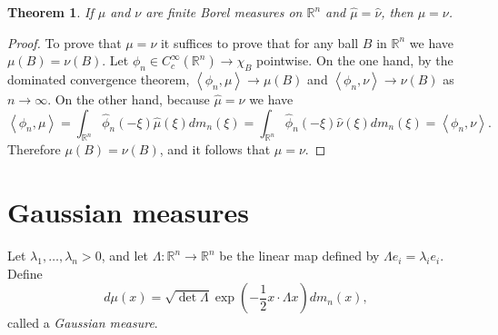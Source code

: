 \documentclass{article}
\newcommand{\inner}[2]{\left\langle #1, #2 \right\rangle}
\newtheorem{theorem}{Theorem}
\theoremstyle{definition}
\begin{document}
\begin{theorem}
If $\mu$ and $\nu$ are finite Borel  measures on $\mathbb{R}^n$ and $\hat{\mu}=\hat{\nu}$, then $\mu=\nu$.
\end{theorem}
\begin{proof}
To prove that $\mu=\nu$ it suffices to prove that for any ball $B$ in $\mathbb{R}^n$ we have $\mu(B)=\nu(B)$. 
Let $\phi_n \in C_c^\infty(\mathbb{R}^n) \to \chi_B$ pointwise.  On the one hand, by the dominated convergence theorem,
$\inner{\phi_n}{\mu} \to \mu(B)$ and  $\inner{\phi_n}{\nu} \to \nu(B)$ as $n \to \infty$.
On the other hand, because $\hat{\mu}=\hat{\nu}$ we have
\[
\inner{\phi_n}{\mu}=\int_{\mathbb{R}^n} \hat{\phi}_n(-\xi) \hat{\mu}(\xi) dm_n(\xi)
=\int_{\mathbb{R}^n} \hat{\phi}_n(-\xi) \hat{\nu}(\xi) dm_n(\xi)
=\inner{\phi_n}{\nu}.
\]
Therefore $\mu(B)=\nu(B)$, and it follows that $\mu=\nu$.
\end{proof}


\section{Gaussian measures}
Let $\lambda_1,\ldots,\lambda_n>0$, and let $\Lambda:\mathbb{R}^n \to \mathbb{R}^n$ be the linear map
defined by $\Lambda e_i=\lambda_i e_i$. Define 
\[
d\mu(x) = \sqrt{\det \Lambda} \exp\left(-\frac{1}{2} x\cdot \Lambda x \right) dm_n(x),
\]
called a {\em Gaussian measure}. 
\end{document}
